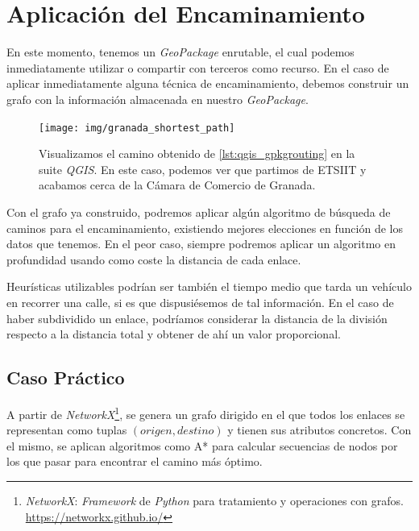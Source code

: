 \section{Aplicación del Encaminamiento}
	En este momento, tenemos un \textit{GeoPackage} enrutable, el cual podemos inmediatamente utilizar o compartir con terceros como recurso. En el caso de aplicar inmediatamente alguna técnica de encaminamiento, debemos construir un grafo con la información almacenada en nuestro \textit{GeoPackage}.
	
	\begin{figure}[htbp]
		\centering
		\texttt{[image: img/granada\_shortest\_path]}
		\caption[Camino más corto (distancia) entre dos puntos]{Visualizamos el camino obtenido de \autoref{lst:qgis_gpkgrouting} en la suite \textit{QGIS}. En este caso, podemos ver que partimos de ETSIIT y acabamos cerca de la Cámara de Comercio de Granada.}
		\label{pathfinding_granada}
	\end{figure}
	
	Con el grafo ya construido, podremos aplicar algún algoritmo de búsqueda de caminos \autocite[255-287]{gvaliente} para el encaminamiento, existiendo mejores elecciones en función de los datos que tenemos. En el peor caso, siempre podremos aplicar un algoritmo en profundidad usando como coste la distancia de cada enlace.
	
	Heurísticas utilizables podrían ser también el tiempo medio que tarda un vehículo en recorrer una calle, si es que dispusiésemos de tal información. En el caso de haber subdividido un enlace, podríamos considerar la distancia de la división respecto a la distancia total y obtener de ahí un valor proporcional.
	
	\subsection*{Caso Práctico}
	A partir de \textit{NetworkX}\footnote{\textit{NetworkX}: \textit{Framework} de \textit{Python} para tratamiento y operaciones con grafos. \url{https://networkx.github.io/}}, se genera un grafo dirigido en el que todos los enlaces se representan como tuplas $(origen, destino)$ y tienen sus atributos concretos. Con el mismo, se aplican algoritmos como A* para calcular secuencias de nodos por los que pasar para encontrar el camino más óptimo.
	
